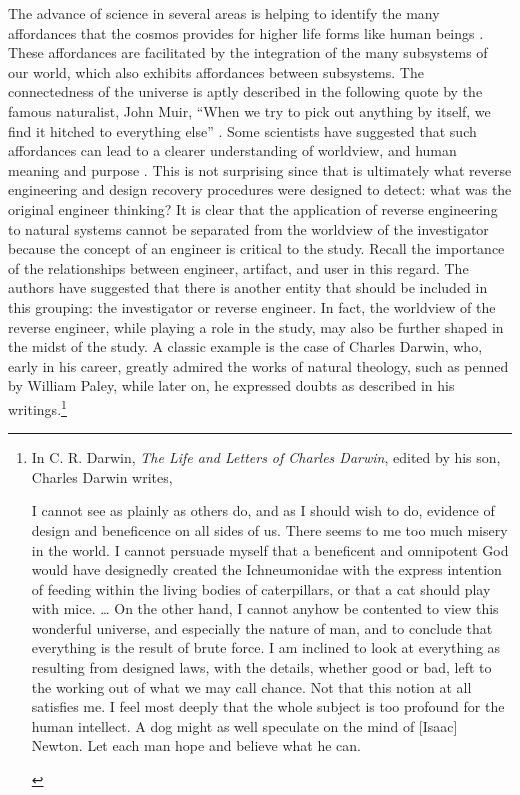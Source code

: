 The advance of science in several areas is helping to identify the many
affordances that the cosmos provides for higher life forms like human
beings . These affordances are facilitated by the
integration of the many subsystems of our world, which also exhibits
affordances between subsystems. The connectedness of the universe is
aptly described in the following quote by the famous naturalist, John
Muir, “When we try to pick out anything by itself, we find it hitched
to everything else” \citep[][p.~110]{muir1988}. Some scientists have suggested
that such affordances can lead to a clearer understanding of
worldview, and human meaning and purpose \citep{denton1998}. This is
not surprising since that is ultimately what reverse engineering and
design recovery procedures were designed to detect: what was the
original engineer thinking? It is clear that the application of reverse
engineering to natural systems cannot be separated from the worldview
of the investigator because the concept of an engineer is critical to
the study. Recall the importance of the relationships between engineer,
artifact, and user in this regard. The authors have suggested that there
is another entity that should be included in this grouping: the
investigator or reverse engineer. In fact, the worldview of the
reverse engineer, while playing a role in the study, may also be
further shaped in the midst of the study. A classic example is the case
of Charles Darwin, who, early in his career, greatly admired the works
of natural theology, such as penned by William Paley, while later on,
he expressed doubts as described in his writings.\footnote{%
In C. R. Darwin, \textit{The Life and Letters of
Charles Darwin}, edited by his son, Charles Darwin writes, 

\begin{quoting}
I cannot see as plainly as others do,
and as I should wish to do, evidence of design and beneficence on all
sides of us. There seems to me too much misery in the world.  I cannot
persuade myself that a beneficent and omnipotent God would have
designedly created the Ichneumonidae with the express intention of
feeding within the living bodies of caterpillars, or that a cat should
play with mice. {\ldots} On the other hand, I cannot anyhow be contented to view
this wonderful universe, and especially the nature of man, and to
conclude that everything is the result of brute force. I am inclined to
look at everything as resulting from designed laws, with the details,
whether good or bad, left to the working out of what we may call
chance. Not that this notion at all satisfies me. I feel most deeply
that the whole subject is too profound for the human intellect. A dog
might as well speculate on the mind of [Isaac] Newton. Let each man
hope and believe what he can. \citep[][p.~312]{darwinll} %
\end{quoting}
}

